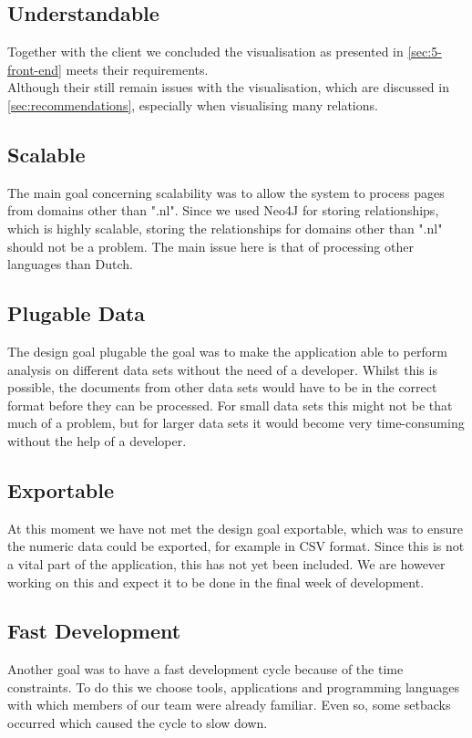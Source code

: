\subsection{Understandable}
Together with the client we concluded the visualisation as presented in \ref{sec:5-front-end} meets their requirements.\\
Although their still remain issues with the visualisation, which are discussed in \ref{sec:recommendations}, especially when visualising many relations.

\subsection{Scalable}
The main goal concerning scalability was to allow the system to process pages from domains other than ".nl". Since we used Neo4J for storing relationships, which is highly scalable, storing the relationships for domains other than ".nl" should not be a problem. The main issue here is that of processing other languages than Dutch.

\subsection{Plugable Data}
The design goal plugable the goal was to make the application able to perform analysis on different data sets without the need of a developer. Whilst this is possible, the documents from other data sets would have to be in the correct format before they can be processed. For small data sets this might not be that much of a problem, but for larger data sets it would become very time-consuming without the help of a developer.

\subsection{Exportable}
At this moment we have not met the design goal exportable, which was to ensure the numeric data could be exported, for example in CSV format. Since this is not a vital part of the application, this has not yet been included. We are however working on this and expect it to be done in the final week of development. 

\subsection{Fast Development}
Another goal was to have a fast development cycle because of the time constraints. To do this we choose tools, applications and programming languages with which members of our team were already familiar. Even so, some setbacks occurred which caused the cycle to slow down.

